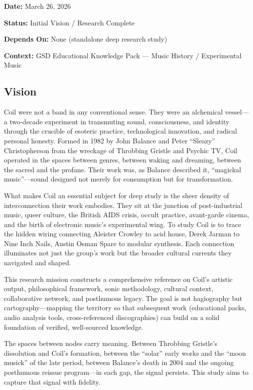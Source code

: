 \documentclass[11pt,letterpaper]{article}
\newcommand{\metafield}[2]{\textbf{\sffamily #1} #2\par}
\begin{document}
\metafield{Date:}{March 26, 2026}
\metafield{Status:}{Initial Vision / Research Complete}
\metafield{Depends On:}{None (standalone deep research study)}
\metafield{Context:}{GSD Educational Knowledge Pack --- Music History / Experimental Music}

\subsection{Vision}

Coil were not a band in any conventional sense. They were an alchemical vessel---a two-decade experiment in transmuting sound, consciousness, and identity through the crucible of esoteric practice, technological innovation, and radical personal honesty. Formed in 1982 by John Balance and Peter ``Sleazy'' Christopherson from the wreckage of Throbbing Gristle and Psychic TV, Coil operated in the spaces between genres, between waking and dreaming, between the sacred and the profane. Their work was, as Balance described it, ``magickal music''---sound designed not merely for consumption but for transformation.

What makes Coil an essential subject for deep study is the sheer density of interconnection their work embodies. They sit at the junction of post-industrial music, queer culture, the British AIDS crisis, occult practice, avant-garde cinema, and the birth of electronic music's experimental wing. To study Coil is to trace the hidden wiring connecting Aleister Crowley to acid house, Derek Jarman to Nine Inch Nails, Austin Osman Spare to modular synthesis. Each connection illuminates not just the group's work but the broader cultural currents they navigated and shaped.

This research mission constructs a comprehensive reference on Coil's artistic output, philosophical framework, sonic methodology, cultural context, collaborative network, and posthumous legacy. The goal is not hagiography but cartography---mapping the territory so that subsequent work (educational packs, audio analysis tools, cross-referenced discographies) can build on a solid foundation of verified, well-sourced knowledge.

The spaces between nodes carry meaning. Between Throbbing Gristle's dissolution and Coil's formation, between the ``solar'' early works and the ``moon musick'' of the late period, between Balance's death in 2004 and the ongoing posthumous reissue program---in each gap, the signal persists. This study aims to capture that signal with fidelity.
\end{document}
